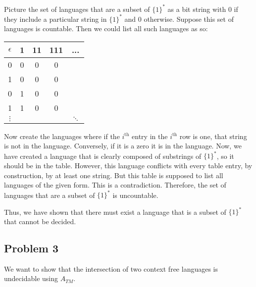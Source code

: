 \documentclass[english]{article}
\begin{document}
Picture the set of languages that are a subset of $\{1\}^*$ as a bit string with 0 if they include
a particular string in $\{1\}^*$ and 0 otherwise. Suppose this set of languages is countable.
Then we could list all such languages as so:\\

\begin{tabular}{c|c|c|c|c}
	$\epsilon$ & 1 & 11 & 111 & ... \\ \hline
	0 & 0 & 0 & 0 & \\ \hline
	1 & 0 & 0 & 0 & \\ \hline
	0 & 1 & 0 & 0 & \\ \hline
	1 & 1 & 0 & 0 & \\ \hline
	$\vdots$ &&&& $\ddots$ \\
\end{tabular}

Now create the languages where if the $i^{\text{th}}$ entry in the $i^{\text{th}}$ row
is one, that string is not in the language. Conversely, if it is a zero it is in the language.
Now, we have created a language that is clearly composed of substrings of $\{1\}^*$, so it
should be in the table. However, this language conflicts with every table entry, by construction,
by at least one string. But this table is supposed to list all languages of the given form.
This is a contradiction. Therefore, the set of languages that are a subset of $\{1\}^*$
is uncountable.

Thus, we have shown that there must exist a language that is a subset of $\{1\}^*$ that cannot
be decided.

\subsection*{Problem 3}
We want to show that the intersection of two context free languages is
undecidable using $A_{TM}$. 
\end{document}
